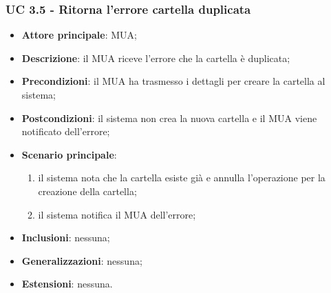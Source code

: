 \subsubsection{UC 3.5 - Ritorna l'errore cartella duplicata} \label{sec:UC3.5}
    \begin{itemize}
        \item \textbf{Attore principale}: MUA;
        \item \textbf{Descrizione}: il MUA riceve l'errore che la cartella è duplicata;
        \item \textbf{Precondizioni}: il MUA ha trasmesso i dettagli per creare la cartella al sistema;
        \item \textbf{Postcondizioni}: il sistema non crea la nuova cartella e il MUA viene notificato dell'errore;
        \item \textbf{Scenario principale}:
            \begin{enumerate}
                \item il sistema nota che la cartella esiste già e annulla l'operazione per la creazione della cartella;
                \item il sistema notifica il MUA dell'errore;
            \end{enumerate}
        \item \textbf{Inclusioni}: nessuna;
        \item \textbf{Generalizzazioni}: nessuna;
        \item \textbf{Estensioni}: nessuna.
    \end{itemize}

